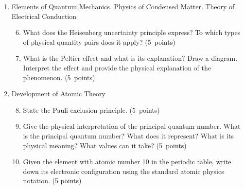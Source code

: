 \documentclass[a4paper,12pt]{letter}
\begin{document}
\begin{enumerate}[label=\Roman*.]
\begin{enumerate}[label=\arabic*.]
 
\end{enumerate}
  

\item Elements of Quantum Mechanics. Physics of Condensed Matter. Theory of Electrical Conduction

\begin{enumerate}[label=\arabic*.]
\setcounter{enumii}{5} %
  
\item What does the Heisenberg uncertainty principle express? To which types of physical quantity pairs does it apply? \hfill (5~points)


\item What is the Peltier effect and what is its explanation? Draw a diagram. Interpret the effect and provide the physical explanation of the phenomenon. \hfill (5~points)

\end{enumerate}

  
\item Development of Atomic Theory

\begin{enumerate}[label=\arabic*.]
\setcounter{enumii}{7} %
  
\item  State the Pauli exclusion principle. \hfill (5~points)

\item Give the physical interpretation of the principal quantum number. What is the principal quantum number? What does it represent? What is its physical meaning? What values can it take? \hfill (5~points)

\item Given the element with atomic number 10 in the periodic table, write down its electronic configuration using the standard atomic physics notation. \hfill (5 points)

\end{enumerate}

\end{enumerate}
\end{document}
